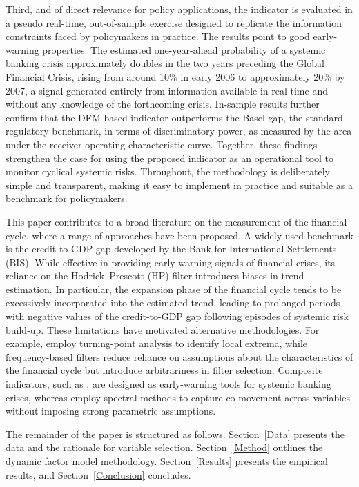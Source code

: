 Third, and of direct relevance for policy applications, the indicator is evaluated in a pseudo real-time, out-of-sample exercise designed to replicate the information constraints faced by policymakers in practice. The results point to good early-warning properties. The estimated one-year-ahead probability of a systemic banking crisis approximately doubles in the two years preceding the Global Financial Crisis, rising from around 10\% in early 2006 to approximately 20\% by 2007, a signal generated entirely from information available in real time and without any knowledge of the forthcoming crisis. In-sample results further confirm that the DFM-based indicator outperforms the Basel gap, the standard regulatory benchmark, in terms of discriminatory power, as measured by the area under the receiver operating characteristic curve. Together, these findings strengthen the case for using the proposed indicator as an operational tool to monitor cyclical systemic risks. Throughout, the methodology is deliberately simple and transparent, making it easy to implement in practice and suitable as a benchmark for policymakers.

This paper contributes to a broad literature on the measurement of the financial cycle, where a range of approaches have been proposed. A widely used benchmark is the credit-to-GDP gap developed by the Bank for International Settlements (BIS). While effective in providing early-warning signals of financial crises, its reliance on the Hodrick--Prescott (HP) filter introduces biases in trend estimation. In particular, the expansion phase of the financial cycle tends to be excessively incorporated into the estimated trend, leading to prolonged periods with negative values of the credit-to-GDP gap following episodes of systemic risk build-up. These limitations have motivated alternative methodologies. For example, \cite{drehmann2012characterising} employ turning-point analysis to identify local extrema, while frequency-based filters reduce reliance on assumptions about the characteristics of the financial cycle but introduce arbitrariness in filter selection. Composite indicators, such as \cite{lang2019anticipating}, are designed as early-warning tools for systemic banking crises, whereas \cite{schuler2020financial} employ spectral methods to capture co-movement across variables without imposing strong parametric assumptions.

The remainder of the paper is structured as follows. Section~\ref{Data} presents the data and the rationale for variable selection. Section~\ref{Method} outlines the dynamic factor model methodology. Section~\ref{Results} presents the empirical results, and Section~\ref{Conclusion} concludes.
